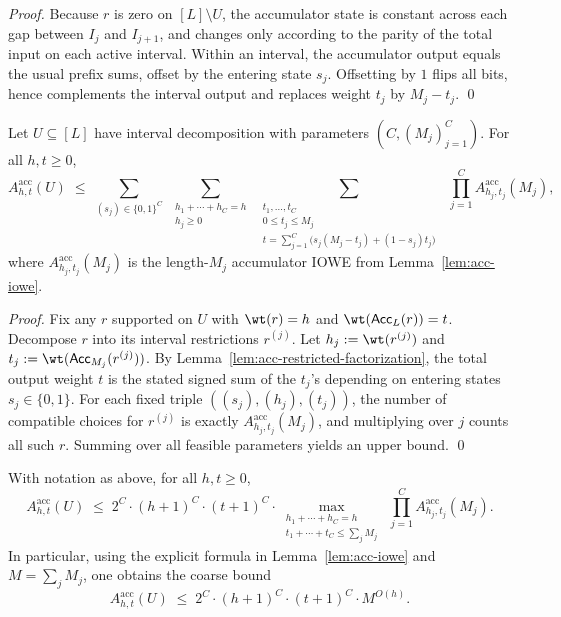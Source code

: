 \begin{proof}
Because $r$ is zero on $[L]\setminus U$, the accumulator state is constant across each gap between $I_j$ and $I_{j+1}$,
and changes only according to the parity of the total input on each active interval.
Within an interval, the accumulator output equals the usual prefix sums, offset by the entering state $s_j$.
Offsetting by $1$ flips all bits, hence complements the interval output and replaces weight $t_j$ by $M_j-t_j$.
\qed
\end{proof}

\begin{lemma}
\label{lem:acc-restricted-upperbound}
Let $U\subseteq [L]$ have interval decomposition with parameters $(C,(M_j)_{j=1}^C)$.
For all $h,t\ge 0$,
\[
A^{\mathrm{acc}}_{h,t}(U)
\;\le\;
\sum_{(s_j)\in\{0,1\}^C}
\;\sum_{\substack{h_1+\cdots+h_C=h\\ h_j\ge 0}}
\;\sum_{\substack{t_1,\dots,t_C\\ 0\le t_j\le M_j\\
t=\sum_{j=1}^C \big(s_j(M_j-t_j)+(1-s_j)t_j\big)}}
\ \ \prod_{j=1}^C A^{\mathrm{acc}}_{h_j,t_j}(M_j),
\]
where $A^{\mathrm{acc}}_{h_j,t_j}(M_j)$ is the length-$M_j$ accumulator IOWE from Lemma~\ref{lem:acc-iowe}.

\end{lemma}

\begin{proof}
Fix any $r$ supported on $U$ with $\wt(r)=h$ and $\wt({\sf Acc}_L(r))=t$.
Decompose $r$ into its interval restrictions $r^{(j)}$.
Let $h_j:=\wt(r^{(j)})$ and $t_j:=\wt({\sf Acc}_{M_j}(r^{(j)}))$.
By Lemma~\ref{lem:acc-restricted-factorization}, the total output weight $t$ is the stated signed sum of the $t_j$'s
depending on entering states $s_j\in\{0,1\}$.
For each fixed triple $((s_j),(h_j),(t_j))$, the number of compatible choices for $r^{(j)}$ is exactly
$A^{\mathrm{acc}}_{h_j,t_j}(M_j)$, and multiplying over $j$ counts all such $r$.
Summing over all feasible parameters yields an upper bound.
\qed
\end{proof}

\begin{corollary}
\label{cor:acc-restricted-crude}
With notation as above, for all $h,t\ge 0$,
\[
A^{\mathrm{acc}}_{h,t}(U)
\;\le\;
2^{C}\cdot (h+1)^{C}\cdot (t+1)^{C}\cdot
\max_{\substack{h_1+\cdots+h_C=h\\ t_1+\cdots+t_C\le \sum_j M_j}}
\ \prod_{j=1}^C A^{\mathrm{acc}}_{h_j,t_j}(M_j).
\]
In particular, using the explicit formula in Lemma~\ref{lem:acc-iowe} and $M=\sum_j M_j$,
one obtains the coarse bound
\[
A^{\mathrm{acc}}_{h,t}(U)\;\le\; 2^{C}\cdot (h+1)^{C}\cdot (t+1)^{C}\cdot M^{O(h)}.
\]
\end{corollary}


